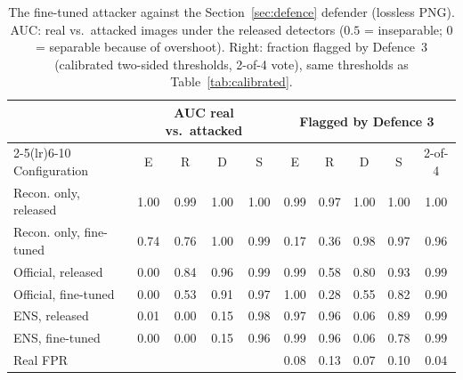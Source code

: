 \begin{table}[!t]
\caption{The fine-tuned attacker against the Section~\ref{sec:defence} defender (lossless PNG). AUC: real vs.\ attacked images under the released detectors ($0.5$ = inseparable; $0$ = separable because of overshoot). Right: fraction flagged by Defence~3 (calibrated two-sided thresholds, 2-of-4 vote), same thresholds as Table~\ref{tab:calibrated}.}
\label{tab:ft_defence}
\centering\footnotesize\setlength{\tabcolsep}{3.5pt}
\begin{tabular}{l cccc ccccc}
\toprule
 & \multicolumn{4}{c}{AUC real vs.\ attacked} & \multicolumn{5}{c}{Flagged by Defence 3} \\
\cmidrule(lr){2-5}\cmidrule(lr){6-10}
Configuration & E & R & D & S & E & R & D & S & 2-of-4 \\
\midrule
Recon. only, released & 1.00 & 0.99 & 1.00 & 1.00 & 0.99 & 0.97 & 1.00 & 1.00 & 1.00 \\
Recon. only, fine-tuned & 0.74 & 0.76 & 1.00 & 0.99 & 0.17 & 0.36 & 0.98 & 0.97 & 0.96 \\
Official, released & 0.00 & 0.84 & 0.96 & 0.99 & 0.99 & 0.58 & 0.80 & 0.93 & 0.99 \\
Official, fine-tuned & 0.00 & 0.53 & 0.91 & 0.97 & 1.00 & 0.28 & 0.55 & 0.82 & 0.90 \\
ENS, released & 0.01 & 0.00 & 0.15 & 0.98 & 0.97 & 0.96 & 0.06 & 0.89 & 0.99 \\
ENS, fine-tuned & 0.00 & 0.00 & 0.15 & 0.96 & 0.99 & 0.96 & 0.06 & 0.78 & 0.99 \\
\midrule
Real FPR &  &  &  &  & 0.08 & 0.13 & 0.07 & 0.10 & 0.04 \\
\bottomrule
\end{tabular}
\end{table}
